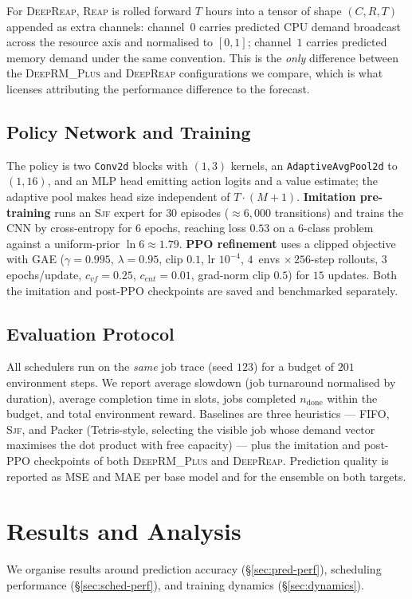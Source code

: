 \documentclass{svproc}
\newcommand{\reap}{\textsc{Reap}}
\newcommand{\deeprm}{\textsc{DeepRM\_Plus}}
\newcommand{\deepreap}{\textsc{DeepReap}}
\newcommand{\sjf}{\textsc{Sjf}}
\begin{document}
For \deepreap{}, \reap{} is rolled forward $T$ hours into a tensor of
shape $(C,R,T)$ appended as extra channels: channel~$0$ carries
predicted CPU demand broadcast across the resource axis and normalised
to $[0,1]$; channel~$1$ carries predicted memory demand under the same
convention. This is the \emph{only} difference between the \deeprm{}
and \deepreap{} configurations we compare, which is what licenses
attributing the performance difference to the forecast.

\subsection{Policy Network and Training}\label{sec:training}
The policy is two \texttt{Conv2d} blocks with $(1,3)$ kernels, an
\texttt{AdaptiveAvgPool2d} to $(1,16)$, and an MLP head emitting action
logits and a value estimate; the adaptive pool makes head size
independent of $T\cdot(M{+}1)$. \textbf{Imitation pre-training} runs an
\sjf{} expert for $30$ episodes ($\approx6{,}000$ transitions) and
trains the CNN by cross-entropy for $6$ epochs, reaching loss $0.53$ on
a $6$-class problem against a uniform-prior $\ln 6\approx1.79$.
\textbf{PPO refinement} uses a clipped objective with GAE
($\gamma{=}0.995$, $\lambda{=}0.95$, clip $0.1$, lr $10^{-4}$,
$4$~envs $\times\,256$-step rollouts, $3$ epochs/update,
$c_{vf}{=}0.25$, $c_{ent}{=}0.01$, grad-norm clip $0.5$) for $15$
updates. Both the imitation and post-PPO checkpoints are saved and
benchmarked separately.

\subsection{Evaluation Protocol}\label{sec:metrics}
All schedulers run on the \emph{same} job trace (seed $123$) for a
budget of $201$ environment steps. We report average slowdown (job
turnaround normalised by duration), average completion time in slots,
jobs completed $n_{\text{done}}$ within the budget, and total
environment reward. Baselines are three heuristics --- FIFO, \sjf{}, and
Packer (Tetris-style, selecting the visible job whose demand vector
maximises the dot product with free capacity) --- plus the imitation and
post-PPO checkpoints of both \deeprm{} and \deepreap{}. Prediction
quality is reported as MSE and MAE per base model and for the ensemble
on both targets.

\section{Results and Analysis}\label{sec:results}
We organise results around prediction accuracy
(\S\ref{sec:pred-perf}), scheduling performance
(\S\ref{sec:sched-perf}), and training dynamics
(\S\ref{sec:dynamics}).
\end{document}
